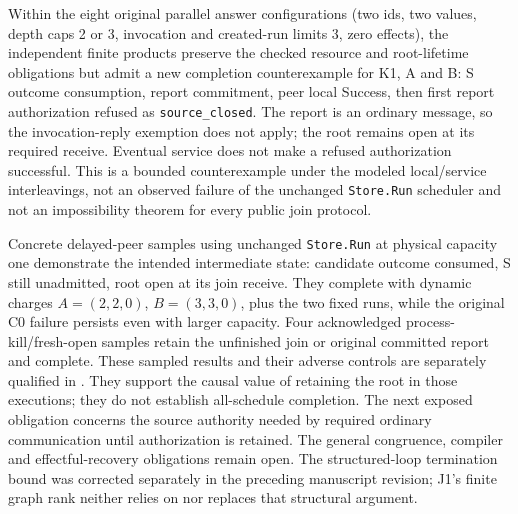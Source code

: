 \documentclass[11pt,a4paper]{article}
\theoremstyle{definition}
\theoremstyle{remark}
\begin{document}
Within the eight original parallel answer configurations (two ids, two values, depth caps 2 or 3, invocation and created-run limits 3, zero effects), the independent finite products preserve the checked resource and root-lifetime obligations but admit a new completion counterexample for K1, A and B: S outcome consumption, report commitment, peer local Success, then first report authorization refused as \texttt{source\_closed}. The report is an ordinary message, so the invocation-reply exemption does not apply; the root remains open at its required receive. Eventual service does not make a refused authorization successful. This is a bounded counterexample under the modeled local/service interleavings, not an observed failure of the unchanged \texttt{Store.Run} scheduler and not an impossibility theorem for every public join protocol.

Concrete delayed-peer samples using unchanged \texttt{Store.Run} at physical capacity one demonstrate the intended intermediate state: candidate outcome consumed, S still unadmitted, root open at its join receive. They complete with dynamic charges $A=(2,2,0)$, $B=(3,3,0)$, plus the two fixed runs, while the original C0 failure persists even with larger capacity. Four acknowledged process-kill/fresh-open samples retain the unfinished join or original committed report and complete. These sampled results and their adverse controls are separately qualified in . They support the causal value of retaining the root in those executions; they do not establish all-schedule completion. The next exposed obligation concerns the source authority needed by required ordinary communication until authorization is retained. The general congruence, compiler and effectful-recovery obligations remain open. The structured-loop termination bound was corrected separately in the preceding manuscript revision; J1's finite graph rank neither relies on nor replaces that structural argument.
\end{document}
